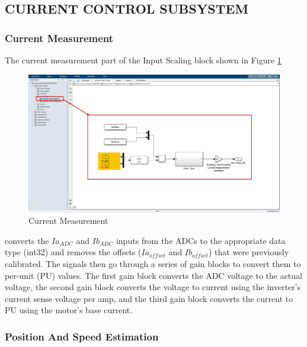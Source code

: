 \subsection{CURRENT CONTROL SUBSYSTEM}


\subsubsection{Current Measurement}


The current measurement part of the Input Scaling block shown in Figure \ref{fig:current_measurement}

\begin{figure}[H]
	\centering
	\includegraphics[width=7in]{sections/section3/images/simulation/inputScaling/currentMeasurement.png}
	\caption{Current Measurement}
	\label{fig:current_measurement}
\end{figure}


converts the $Ia_{ADC}$ and $Ib_{ADC}$ inputs from the ADCs to the appropriate data type (int32) and removes the offsets ($Ia_{offset}$ and $Ib_{offset}$) that were previously calibrated. The signals then go through a series of gain blocks to convert them to per-unit (PU) values. The first gain block converts the ADC voltage to the actual voltage, the second gain block converts the voltage to current using the inverter's current sense voltage per amp, and the third gain block converts the current to PU using the motor's base current.


\subsubsection{Position And Speed Estimation}



